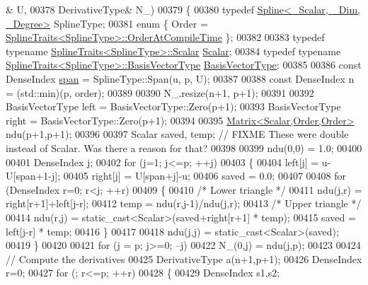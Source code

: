 \begin{DoxyCode}
      & U,
00378     DerivativeType& N\_)
00379   \{
00380     \textcolor{keyword}{typedef} \hyperlink{group___splines___module_class_eigen_1_1_spline}{Spline<\_Scalar, \_Dim, \_Degree>} SplineType;
00381     \textcolor{keyword}{enum} \{ Order = \hyperlink{struct_eigen_1_1_spline_traits}{SplineTraits<SplineType>::OrderAtCompileTime}
       \};
00382 
00383     \textcolor{keyword}{typedef} \textcolor{keyword}{typename} \hyperlink{struct_eigen_1_1_spline_traits}{SplineTraits<SplineType>::Scalar} 
      \hyperlink{group___splines___module_a8cafd78b564825c76fbb3419653d9742}{Scalar};
00384     \textcolor{keyword}{typedef} \textcolor{keyword}{typename} \hyperlink{struct_eigen_1_1_spline_traits}{SplineTraits<SplineType>::BasisVectorType} 
      \hyperlink{group___splines___module_a1d49cef942ea59d85d1711ee32354e6b}{BasisVectorType};
00385   
00386     \textcolor{keyword}{const} DenseIndex \hyperlink{group___splines___module_ab62751802b4cc237aadb0dbf3455df98}{span} = SplineType::Span(u, p, U);
00387 
00388     \textcolor{keyword}{const} DenseIndex n = (std::min)(p, order);
00389 
00390     N\_.resize(n+1, p+1);
00391 
00392     BasisVectorType left = BasisVectorType::Zero(p+1);
00393     BasisVectorType right = BasisVectorType::Zero(p+1);
00394 
00395     \hyperlink{group___core___module_class_eigen_1_1_matrix}{Matrix<Scalar,Order,Order>} ndu(p+1,p+1);
00396 
00397     Scalar saved, temp; \textcolor{comment}{// FIXME These were double instead of Scalar. Was there a reason for that?}
00398 
00399     ndu(0,0) = 1.0;
00400 
00401     DenseIndex j;
00402     \textcolor{keywordflow}{for} (j=1; j<=p; ++j)
00403     \{
00404       left[j] = u-U[span+1-j];
00405       right[j] = U[span+j]-u;
00406       saved = 0.0;
00407 
00408       \textcolor{keywordflow}{for} (DenseIndex r=0; r<j; ++r)
00409       \{
00410         \textcolor{comment}{/* Lower triangle */}
00411         ndu(j,r) = right[r+1]+left[j-r];
00412         temp = ndu(r,j-1)/ndu(j,r);
00413         \textcolor{comment}{/* Upper triangle */}
00414         ndu(r,j) = \textcolor{keyword}{static\_cast<}Scalar\textcolor{keyword}{>}(saved+right[r+1] * temp);
00415         saved = left[j-r] * temp;
00416       \}
00417 
00418       ndu(j,j) = \textcolor{keyword}{static\_cast<}Scalar\textcolor{keyword}{>}(saved);
00419     \}
00420 
00421     \textcolor{keywordflow}{for} (j = p; j>=0; --j) 
00422       N\_(0,j) = ndu(j,p);
00423 
00424     \textcolor{comment}{// Compute the derivatives}
00425     DerivativeType a(n+1,p+1);
00426     DenseIndex r=0;
00427     \textcolor{keywordflow}{for} (; r<=p; ++r)
00428     \{
00429       DenseIndex s1,s2;

\end{DoxyCode}
